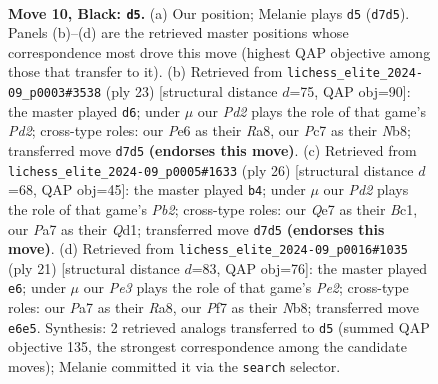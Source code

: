 \documentclass[11pt]{article}
\begin{document}
\begin{figure}[p]
\label{fig:thought-m17}
\end{figure}

\clearpage

\begin{figure}[p]\centering
\begin{subfigure}{0.46\textwidth}\centering
\resizebox{\linewidth}{!}{%
\newchessgame
\chessboard[
  setfen={1rb2rk1/p1ppqppp/2n1pn2/1pP5/3P4/2B1PNP1/PP3P1P/R2QKBR1 b Q - 1 10},
  showmover=false,
  pgfstyle=straightmove, color=movearrow, markmove={d7-d5}
]}
\caption{}
\end{subfigure}\hfill
\begin{subfigure}{0.46\textwidth}\centering
\resizebox{\linewidth}{!}{%
\newchessgame
\chessboard[
  setfen={rn1q1rk1/1b1p1ppp/p4n2/1ppP4/4P3/P1NB1P2/1P4PP/R1BQ1RK1 b - - 1 12},
  showmover=false,
  pgfstyle=straightmove, color=movearrow, markmove={d7-d6}
]}
\caption{}
\end{subfigure}
\\[4pt]
\begin{subfigure}{0.46\textwidth}\centering
\resizebox{\linewidth}{!}{%
\newchessgame
\chessboard[
  setfen={r2qk2r/1p2bp2/p1b1p1pn/3pP2p/3P4/2N2N2/PP3PPP/1RBQ1RK1 w kq - 2 14},
  showmover=false,
  pgfstyle=straightmove, color=movearrow, markmove={b2-b4}
]}
\caption{}
\end{subfigure}\hfill
\begin{subfigure}{0.46\textwidth}\centering
\resizebox{\linewidth}{!}{%
\newchessgame
\chessboard[
  setfen={rn1q1rk1/1b1pppbp/p4np1/1p1P4/4P3/P1N2NP1/1P3PBP/R1BQ1RK1 b - - 0 11},
  showmover=false,
  pgfstyle=straightmove, color=movearrow, markmove={e7-e6}
]}
\caption{}
\end{subfigure}
\caption{\textbf{Move 10, Black: \texttt{d5}.} (a) Our position; Melanie plays \texttt{d5} (\texttt{d7d5}). Panels (b)--(d) are the retrieved master positions whose correspondence most drove this move (highest QAP objective among those that transfer to it). (b) Retrieved from \texttt{lichess\_elite\_2024-09\_p0003\#3538} (ply 23) [structural distance $d$=75, QAP obj=90]: the master played \texttt{d6}; under $\mu$ our \emph{Pd2} plays the role of that game's \emph{Pd2}; cross-type roles: our \emph{P}e6 as their \emph{R}a8, our \emph{P}c7 as their \emph{N}b8; transferred move \texttt{d7d5} \textbf{(endorses this move)}. (c) Retrieved from \texttt{lichess\_elite\_2024-09\_p0005\#1633} (ply 26) [structural distance $d$=68, QAP obj=45]: the master played \texttt{b4}; under $\mu$ our \emph{Pd2} plays the role of that game's \emph{Pb2}; cross-type roles: our \emph{Q}e7 as their \emph{B}c1, our \emph{P}a7 as their \emph{Q}d1; transferred move \texttt{d7d5} \textbf{(endorses this move)}. (d) Retrieved from \texttt{lichess\_elite\_2024-09\_p0016\#1035} (ply 21) [structural distance $d$=83, QAP obj=76]: the master played \texttt{e6}; under $\mu$ our \emph{Pe3} plays the role of that game's \emph{Pe2}; cross-type roles: our \emph{P}a7 as their \emph{R}a8, our \emph{P}f7 as their \emph{N}b8; transferred move \texttt{e6e5}. Synthesis: 2 retrieved analogs transferred to \texttt{d5} (summed QAP objective 135, the strongest correspondence among the candidate moves); Melanie committed it via the \texttt{search} selector.}

\end{figure}
\end{document}
